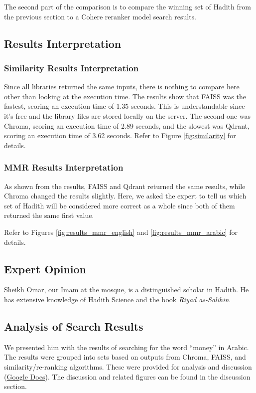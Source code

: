 The second part of the comparison is to compare the winning set of Hadith from the previous section to a Cohere reranker model search results.

\subsection{Results Interpretation}

\subsubsection{Similarity Results Interpretation}

Since all libraries returned the same inputs, there is nothing to compare here other than looking at the execution time. The results show that FAISS was the fastest, scoring an execution time of 1.35 seconds. This is understandable since it’s free and the library files are stored locally on the server. The second one was Chroma, scoring an execution time of 2.89 seconds, and the slowest was Qdrant, scoring an execution time of 3.62 seconds. Refer to Figure \ref{fig:similarity} for details.

\subsubsection{MMR Results Interpretation}

As shown from the results, FAISS and Qdrant returned the same results, while Chroma changed the results slightly. Here, we asked the expert to tell us which set of Hadith will be considered more correct as a whole since both of them returned the same first value.

Refer to Figures \ref{fig:results_mmr_english} and \ref{fig:results_mmr_arabic} for details.

\subsection{Expert Opinion}
Sheikh Omar, our Imam at the mosque, is a distinguished scholar in Hadith. He has extensive knowledge of Hadith Science and the book \textit{Riyad as-Salihin}.

\subsection*{Analysis of Search Results}
We presented him with the results of searching for the word ``money'' in Arabic. The results were grouped into sets based on outputs from Chroma, FAISS, and similarity/re-ranking algorithms. These were provided for analysis and discussion (\href{https://docs.google.com}{Google Docs}). The discussion and related figures can be found in the discussion section.

